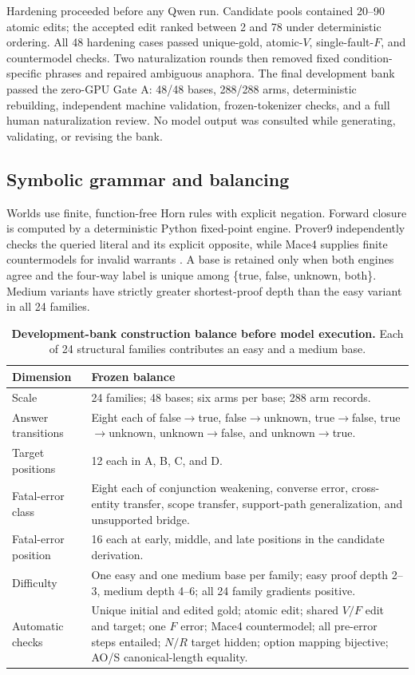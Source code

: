 \documentclass[letterpaper]{article}
\begin{document}
Hardening proceeded before any Qwen run.  Candidate pools contained 20--90 atomic edits; the accepted edit ranked between 2 and 78 under deterministic ordering.  All 48 hardening cases passed unique-gold, atomic-$V$, single-fault-$F$, and countermodel checks.  Two naturalization rounds then removed fixed condition-specific phrases and repaired ambiguous anaphora.  The final development bank passed the zero-GPU Gate A: 48/48 bases, 288/288 arms, deterministic rebuilding, independent machine validation, frozen-tokenizer checks, and a full human naturalization review.  No model output was consulted while generating, validating, or revising the bank.

\subsection{Symbolic grammar and balancing}

Worlds use finite, function-free Horn rules with explicit negation.  Forward closure is computed by a deterministic Python fixed-point engine.  Prover9 independently checks the queried literal and its explicit opposite, while Mace4 supplies finite countermodels for invalid warrants \citep{mccune2010prover9mace4}.  A base is retained only when both engines agree and the four-way label is unique among \{true, false, unknown, both\}.  Medium variants have strictly greater shortest-proof depth than the easy variant in all 24 families.

\begin{table}[t]
\centering
\small
\begin{tabular}{L{3.0cm}L{10.7cm}}
\toprule
Dimension & Frozen balance \\
\midrule
Scale & 24 families; 48 bases; six arms per base; 288 arm records. \\
Answer transitions & Eight each of false$\rightarrow$true, false$\rightarrow$unknown, true$\rightarrow$false, true$\rightarrow$unknown, unknown$\rightarrow$false, and unknown$\rightarrow$true. \\
Target positions & 12 each in A, B, C, and D. \\
Fatal-error class & Eight each of conjunction weakening, converse error, cross-entity transfer, scope transfer, support-path generalization, and unsupported bridge. \\
Fatal-error position & 16 each at early, middle, and late positions in the candidate derivation. \\
Difficulty & One easy and one medium base per family; easy proof depth 2--3, medium depth 4--6; all 24 family gradients positive. \\
Automatic checks & Unique initial and edited gold; atomic edit; shared $V/F$ edit and target; one $F$ error; Mace4 countermodel; all pre-error steps entailed; $N/R$ target hidden; option mapping bijective; AO/S canonical-length equality. \\
\bottomrule
\end{tabular}
\caption{\textbf{Development-bank construction balance before model execution.} Each of 24 structural families contributes an easy and a medium base.}
\label{tab:supp-data-balance}
\end{table}
\end{document}
